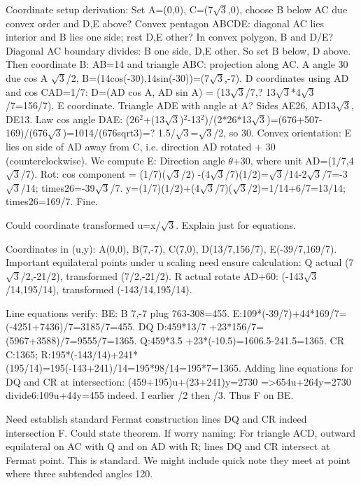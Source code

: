 \begin{decodedreasoningpanel}
Coordinate setup derivation:
Set A=(0,0), C=(7\ensuremath{\sqrt{3}},0), choose B below AC due convex order and D,E above? Convex pentagon ABCDE: diagonal AC lies interior and B lies one side; rest D,E other? In convex polygon, B and D/E? Diagonal AC boundary divides: B one side, D,E other. So set B below, D above. Then coordinate B:
AB=14 and triangle ABC: projection along AC. A angle 30 due cos A \ensuremath{\sqrt{3}}/2, B=(14cos(-30),14sin(-30))=(7\ensuremath{\sqrt{3}},-7).
D coordinates using AD and cos CAD=1/7:
D=(AD cos A, AD sin A) = (13\ensuremath{\sqrt{3}}/7,? 13\ensuremath{\sqrt{3}}*4\ensuremath{\sqrt{3}}/7=156/7).
E coordinate. Triangle ADE with angle at A? Sides AE26, AD13\ensuremath{\sqrt{3}}, DE13. Law cos angle DAE:
(26\ensuremath{^2}+(13\ensuremath{\sqrt{3}})\ensuremath{^2}-13\ensuremath{^2})/(2*26*13\ensuremath{\sqrt{3}})=(676+507-169)/(676\ensuremath{\sqrt{3}})=1014/(676sqrt3)=? 1.5/\ensuremath{\sqrt{3}}=\ensuremath{\sqrt{3}}/2, so 30. Convex orientation: E lies on side of AD away from C, i.e. direction AD rotated +
  30 (counterclockwise). We compute E:
Direction angle \ensuremath{\theta}+30, where unit AD=(1/7,4\ensuremath{\sqrt{3}}/7). Rot:
cos component = (1/7)(\ensuremath{\sqrt{3}}/2) -(4\ensuremath{\sqrt{3}}/7)(1/2)=\ensuremath{\sqrt{3}}/14-2\ensuremath{\sqrt{3}}/7=-3\ensuremath{\sqrt{3}}/14; times26=-39\ensuremath{\sqrt{3}}/7.
y=(1/7)(1/2)+(4\ensuremath{\sqrt{3}}/7)(\ensuremath{\sqrt{3}}/2)=1/14+6/7=13/14; times26=169/7.
Fine.

Could coordinate transformed u=x/\ensuremath{\sqrt{3}}. Explain just for equations.

Coordinates in (u,y):
A(0,0), B(7,-7), C(7,0), D(13/7,156/7), E(-39/7,169/7). Important equilateral points under u scaling need ensure calculation:
Q actual (7\ensuremath{\sqrt{3}}/2,-21/2), transformed (7/2,-21/2).
R actual rotate AD+60: (-143\ensuremath{\sqrt{3}}/14,195/14), transformed (-143/14,195/14).

Line equations verify:
BE:
B 7,-7 plug 763-308=455. E:109*(-39/7)+44*169/7=(-4251+7436)/7=3185/7=455.
DQ D:459*13/7 +23*156/7=(5967+3588)/7=9555/7=1365. Q:459*3.5 +23*(-10.5)=1606.5-241.5=1365.
CR C:1365; R:195*(-143/14)+241*(195/14)=195(-143+241)/14=195*98/14=195*7=1365.
Adding line equations for DQ and CR at intersection:
(459+195)u+(23+241)y=2730 =\textgreater{}654u+264y=2730 divide6:109u+44y=455 indeed. I earlier /2 then /3. Thus F on BE.

Need establish standard Fermat construction lines DQ and CR indeed intersection F. Could state theorem. If worry naming: For triangle ACD, outward equilateral on AC with Q and on AD with R; lines DQ and CR intersect at Fermat point. This is standard. We might include quick note they meet
  at point where three subtended angles 120.


\end{decodedreasoningpanel}

